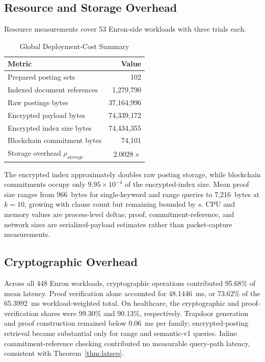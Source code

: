 \documentclass[journal]{IEEEtran}
\theoremstyle{tight}
\theoremstyle{remark}
\theoremstyle{plain}
\begin{document}
\subsection{Resource and Storage Overhead}
\label{4K}

Resource measurements cover 53 Enron-side workloads with three trials each.

\begin{table}[!tb]
\centering
\caption{Global Deployment-Cost Summary}
\label{tab:resource}
\small
\begin{tabular}{lr}
\toprule
\textbf{Metric} & \textbf{Value} \\
\midrule
Prepared posting sets & 102 \\
Indexed document references & 1{,}279{,}790 \\
Raw postings bytes & 37{,}164{,}996 \\
Encrypted payload bytes & 74{,}339{,}172 \\
Encrypted index size bytes & 74{,}434{,}355 \\
Blockchain commitment bytes & 74{,}101 \\
Storage overhead \(\rho_{storage}\) & \(2.0028\times\) \\
\bottomrule
\end{tabular}
\end{table}

The encrypted index approximately doubles raw posting storage, while blockchain commitments occupy only \(9.95\times10^{-4}\) of the encrypted-index size. Mean proof size ranges from 966~bytes for single-keyword and range queries to 7{,}216~bytes at \(k=10\), growing with clause count but remaining bounded by \(s\). CPU and memory values are process-level deltas; proof, commitment-reference, and network sizes are serialized-payload estimates rather than packet-capture measurements.

\subsection{Cryptographic Overhead}
\label{4L}

Across all 448 Enron workloads, cryptographic operations contributed 95.68\% of mean latency. Proof verification alone accounted for 48.1446~ms, or 73.62\% of the 65.3992~ms workload-weighted total. On healthcare, the cryptographic and proof-verification shares were 99.30\% and 90.13\%, respectively. Trapdoor generation and proof construction remained below 0.06~ms per family; encrypted-posting retrieval became substantial only for range and semantic-v1 queries. Inline commitment-reference checking contributed no measurable query-path latency, consistent with Theorem~\ref{thm:latsep}.
\end{document}
